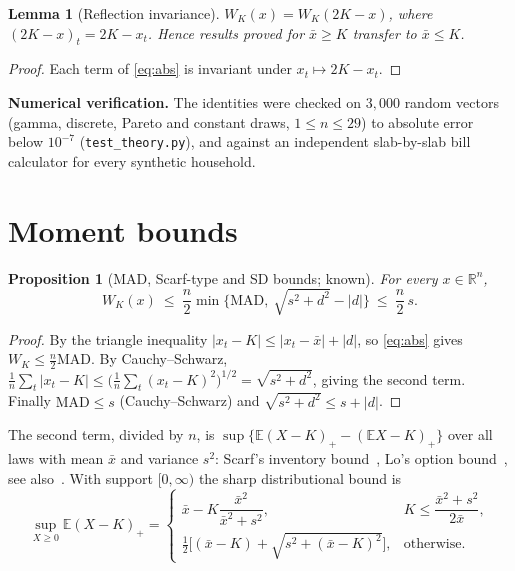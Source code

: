\documentclass[11pt,a4paper]{article}
\newtheorem{proposition}{Proposition}
\theoremstyle{definition}
\theoremstyle{plain}\newtheorem{sprop}{Proposition}[section]\newtheorem{slemma}[sprop]{Lemma}\newtheorem{scor}[sprop]{Corollary}
\theoremstyle{definition}
\theoremstyle{remark}
\newcommand{\xbar}{\bar{x}}
\newcommand{\pos}[1]{\left(#1\right)_{+}}
\numberwithin{equation}{section}
\begin{document}
\begin{slemma}[Reflection invariance]\label{cor:reflect}
$W_K(x)=W_K(2K-x)$, where $(2K-x)_t=2K-x_t$. Hence results proved for $\xbar\ge K$ transfer to $\xbar\le K$.
\end{slemma}
\begin{proof}
Each term of \eqref{eq:abs} is invariant under $x_t\mapsto2K-x_t$.
\end{proof}

\noindent\textbf{Numerical verification.} The identities were checked on $3{,}000$ random vectors (gamma, discrete, Pareto and constant draws, $1\le n\le 29$) to absolute error below $10^{-7}$ (\texttt{test\_theory.py}), and against an independent slab-by-slab bill calculator for every synthetic household.

\section{Moment bounds}\label{sec:S4}

\setcounter{proposition}{2}\begin{proposition}[MAD, Scarf-type and SD bounds; known]\label{prop:moment}
For every $x\in\mathbb R^n$,
\[
W_K(x)\ \le\ \frac n2\min\Big\{\mathrm{MAD},\ \sqrt{s^2+d^2}-|d|\Big\}\ \le\ \frac n2\,s .
\]
\end{proposition}
\begin{proof}
By the triangle inequality $|x_t-K|\le|x_t-\xbar|+|d|$, so \eqref{eq:abs} gives $W_K\le\frac n2\mathrm{MAD}$. By Cauchy--Schwarz, $\frac1n\sum_t|x_t-K|\le\big(\frac1n\sum_t(x_t-K)^2\big)^{1/2}=\sqrt{s^2+d^2}$, giving the second term. Finally $\mathrm{MAD}\le s$ (Cauchy--Schwarz) and $\sqrt{s^2+d^2}\le s+|d|$.
\end{proof}

\noindent The second term, divided by $n$, is $\sup\{\mathbb E\pos{X-K}-\pos{\mathbb EX-K}\}$ over all laws with mean $\xbar$ and variance $s^2$: Scarf's inventory bound~\cite{scarf}, Lo's option bound~\cite{lo}, see also~\cite{gallego}. With support $[0,\infty)$ the sharp distributional bound is~\cite{lo,bertsimas}
\[
\sup_{X\ge0}\mathbb E\pos{X-K}=\begin{cases}\xbar-K\dfrac{\xbar^2}{\xbar^2+s^2}, & K\le \dfrac{\xbar^2+s^2}{2\xbar},\\[8pt] \tfrac12\big[(\xbar-K)+\sqrt{s^2+(\xbar-K)^2}\big], & \text{otherwise}.\end{cases}
\]
\end{document}
